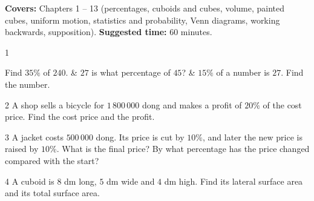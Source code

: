 \begin{knowbox}
\textbf{Covers:} Chapters 1 -- 13 (percentages, cuboids and cubes, volume, painted cubes, uniform motion, statistics and probability, Venn diagrams, working backwards, supposition). \quad \textbf{Suggested time:} $60$ minutes.
\end{knowbox}
\gap
\begin{probbox}{1}{\relax}
\begin{cols3}
 Find $35\%$ of $240$. &  $27$ is what percentage of $45$? &  $15\%$ of a number is $27$. Find the number.
\end{cols3}
\end{probbox}
\gap
\begin{probbox}{2}{\relax}
A shop sells a bicycle for $1\,800\,000$ dong and makes a profit of $20\%$ of the cost price. Find the cost price and the profit.
\end{probbox}
\gap
\begin{probbox}{3}{\relax}
A jacket costs $500\,000$ dong. Its price is cut by $10\%$, and later the new price is raised by $10\%$. What is the final price? By what percentage has the price changed compared with the start?
\end{probbox}
\gap
\begin{probbox}{4}{\relax}
A cuboid is $8$ dm long, $5$ dm wide and $4$ dm high. Find its lateral surface area and its total surface area.
\end{probbox}
